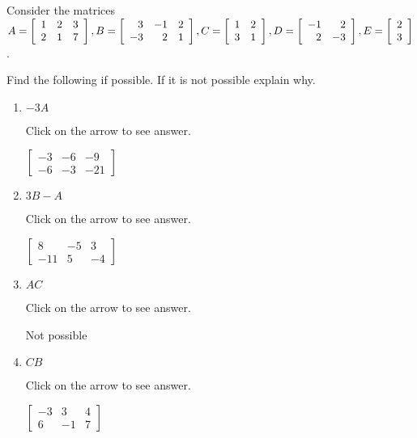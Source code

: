 \documentclass{ximera}
\begin{document}
\begin{problem}\label{prb:4.9} Consider the matrices $
A =\left[
\begin{array}{rrr}
1 & 2 & 3 \\
2 & 1 & 7
\end{array}
\right],  B=\left[
\begin{array}{rrr}
3 & -1 & 2 \\
-3 & 2 & 1
\end{array}
\right],
C =\left[
\begin{array}{rr}
1 & 2 \\
3 & 1
\end{array}
\right], \\ D=\left[
\begin{array}{rr}
-1 & 2 \\
2 & -3
\end{array}
\right],  E=\left[
\begin{array}{r}
2 \\
3
\end{array}
\right]$.

Find the following if possible. If it is not possible explain why.
\begin{enumerate}
\item $-3A$

Click on the arrow to see answer.
\begin{expandable}
$\left[
\begin{array}{rrr}
-3 & -6 & -9 \\
-6 & -3 & -21
\end{array}
\right]$
\end{expandable}

\item $3B-A$

Click on the arrow to see answer.
\begin{expandable}
$\left[
\begin{array}{rrr}
8 & -5 & 3 \\
-11 & 5 & -4
\end{array}
\right]$
\end{expandable}

\item $AC$

Click on the arrow to see answer.
\begin{expandable}
Not possible
\end{expandable}

\item $CB$

Click on the arrow to see answer.
\begin{expandable}
$\left[
\begin{array}{rrr}
-3 & 3 & 4 \\
6 & -1 & 7
\end{array}
\right]$
\end{expandable}


\end{enumerate}
\end{problem}
\end{document}
